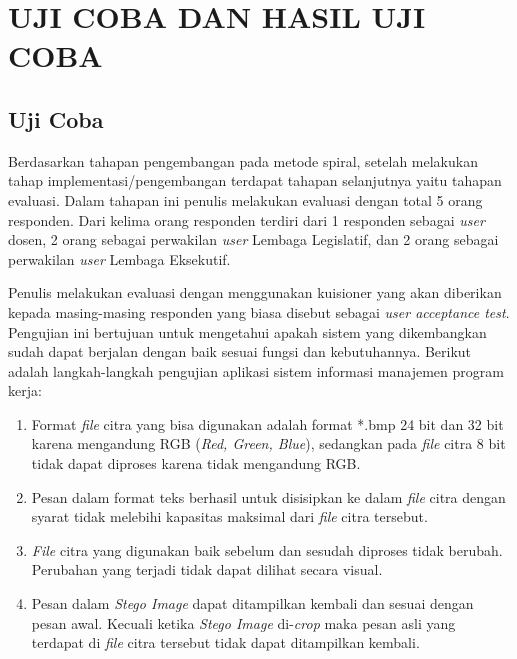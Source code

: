 
\chapter{UJI COBA DAN HASIL UJI COBA}

\section{Uji Coba}
Berdasarkan tahapan pengembangan pada metode spiral, setelah melakukan tahap implementasi/pengembangan terdapat tahapan selanjutnya yaitu tahapan evaluasi. Dalam tahapan ini penulis melakukan evaluasi dengan total 5 orang responden. Dari kelima orang responden terdiri dari 1 responden sebagai \textit{user} dosen, 2 orang sebagai perwakilan \textit{user} Lembaga Legislatif, dan 2 orang sebagai perwakilan \textit{user} Lembaga Eksekutif.

Penulis melakukan evaluasi dengan menggunakan kuisioner yang akan diberikan kepada masing-masing responden yang biasa disebut sebagai \textit{user acceptance test}. Pengujian ini bertujuan untuk mengetahui apakah sistem yang dikembangkan sudah dapat berjalan dengan baik sesuai fungsi dan kebutuhannya. Berikut adalah langkah-langkah pengujian aplikasi sistem informasi manajemen program kerja:

\begin{enumerate}
	\item Format \emph{file} citra yang bisa digunakan adalah format *.bmp 24 bit dan 32 bit karena mengandung RGB (\emph{Red, Green, Blue}), sedangkan pada \emph{file} citra 8 bit tidak dapat diproses karena tidak mengandung RGB.
	
	\item Pesan dalam format teks berhasil untuk disisipkan ke dalam \emph{file} citra dengan syarat tidak melebihi kapasitas maksimal dari \emph{file} citra tersebut.
	
	\item \emph{File} citra yang digunakan baik sebelum dan sesudah diproses tidak berubah. Perubahan yang terjadi tidak dapat dilihat secara visual.
	
	\item Pesan dalam \emph{Stego Image} dapat ditampilkan kembali dan sesuai dengan pesan awal. Kecuali ketika \emph{Stego Image} di-\emph{crop} maka pesan asli yang terdapat di \emph{file} citra tersebut tidak dapat ditampilkan kembali.

\end{enumerate}


